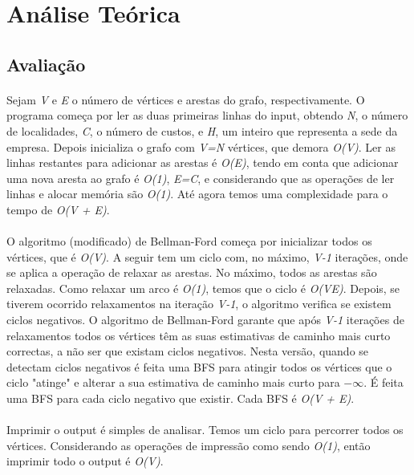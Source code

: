 \documentclass[12pt, a4paper]{article}
\begin{document}
\section{Análise Teórica}
\subsection{Avaliação}
\paragraph{}
Sejam \textit{V} e \textit{E} o número de vértices e arestas do grafo,
respectivamente.  O programa começa por ler as duas primeiras linhas do input,
obtendo \textit{N}, o número de localidades, \textit{C}, o número de custos, e
\textit{H}, um inteiro que representa a sede da empresa. Depois inicializa o
grafo com \textit{V=N} vértices, que demora \textit{O(V)}. Ler as linhas
restantes para adicionar as arestas é \textit{O(E)}, tendo em conta que
adicionar uma nova aresta ao grafo é \textit{O(1)}, \textit{E=C}, e considerando
que as operações de ler linhas e alocar memória são \textit{O(1)}. Até agora
temos uma complexidade para o tempo de \textit{O(V + E)}.

\paragraph{}
O algoritmo (modificado) de Bellman-Ford começa por inicializar todos os
vértices, que é \textit{O(V)}. A seguir tem um ciclo com, no máximo,
\textit{V-1} iterações, onde se aplica a operação de relaxar as arestas. No
máximo, todos as arestas são relaxadas. Como relaxar um arco é \textit{O(1)},
temos que o ciclo é \textit{O(VE)}. Depois, se tiverem ocorrido relaxamentos na
iteração \textit{V-1}, o algoritmo verifica se existem ciclos negativos. O
algoritmo de Bellman-Ford garante que após \textit{V-1} iterações de
relaxamentos todos os vértices têm as suas estimativas de caminho mais curto
correctas, a não ser que existam ciclos negativos. Nesta versão, quando se
detectam ciclos negativos é feita uma BFS para atingir todos os vértices que o
ciclo "atinge" e alterar a sua estimativa de caminho mais curto para
$-\infty$. É feita uma BFS para cada ciclo negativo que existir. Cada BFS é
\textit{O(V + E)}.

\paragraph{}
Imprimir o output é simples de analisar. Temos um ciclo para percorrer todos os
vértices. Considerando as operações de impressão como sendo \textit{O(1)}, então
imprimir todo o output é \textit{O(V)}.
\end{document}
